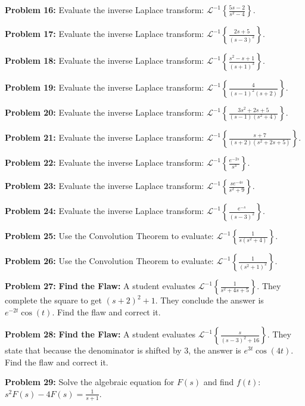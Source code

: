 \documentclass[11pt, letterpaper]{article}
\theoremstyle{definition}
\theoremstyle{remark}
\begin{document}
\textbf{Problem 16:} Evaluate the inverse Laplace transform: $\displaystyle \mathcal{L}^{-1} \left\{ \frac{5s - 2}{s^2 - 4} \right\}$.

\textbf{Problem 17:} Evaluate the inverse Laplace transform: $\displaystyle \mathcal{L}^{-1} \left\{ \frac{2s + 5}{(s-3)^2} \right\}$.

\textbf{Problem 18:} Evaluate the inverse Laplace transform: $\displaystyle \mathcal{L}^{-1} \left\{ \frac{s^2 - s + 1}{(s+1)^3} \right\}$.

\textbf{Problem 19:} Evaluate the inverse Laplace transform: $\displaystyle \mathcal{L}^{-1} \left\{ \frac{4}{(s-1)^2(s+2)} \right\}$.

\textbf{Problem 20:} Evaluate the inverse Laplace transform: $\displaystyle \mathcal{L}^{-1} \left\{ \frac{3s^2 + 2s + 5}{(s-1)(s^2 + 4)} \right\}$.

\textbf{Problem 21:} Evaluate the inverse Laplace transform: $\displaystyle \mathcal{L}^{-1} \left\{ \frac{s + 7}{(s+2)(s^2 + 2s + 5)} \right\}$.

\textbf{Problem 22:} Evaluate the inverse Laplace transform: $\displaystyle \mathcal{L}^{-1} \left\{ \frac{e^{-2s}}{s^3} \right\}$.

\textbf{Problem 23:} Evaluate the inverse Laplace transform: $\displaystyle \mathcal{L}^{-1} \left\{ \frac{s e^{-4s}}{s^2 + 9} \right\}$.

\textbf{Problem 24:} Evaluate the inverse Laplace transform: $\displaystyle \mathcal{L}^{-1} \left\{ \frac{e^{-s}}{(s-3)^2} \right\}$.

\textbf{Problem 25:} Use the Convolution Theorem to evaluate: $\displaystyle \mathcal{L}^{-1} \left\{ \frac{1}{s(s^2+4)} \right\}$.

\textbf{Problem 26:} Use the Convolution Theorem to evaluate: $\displaystyle \mathcal{L}^{-1} \left\{ \frac{1}{(s^2+1)^2} \right\}$.

\textbf{Problem 27:} \textbf{Find the Flaw:} A student evaluates $\displaystyle \mathcal{L}^{-1} \left\{ \frac{1}{s^2 + 4s + 5} \right\}$. They complete the square to get $(s+2)^2 + 1$. They conclude the answer is $e^{-2t}\cos(t)$. Find the flaw and correct it.

\textbf{Problem 28:} \textbf{Find the Flaw:} A student evaluates $\displaystyle \mathcal{L}^{-1} \left\{ \frac{s}{(s-3)^2 + 16} \right\}$. They state that because the denominator is shifted by $3$, the answer is $e^{3t}\cos(4t)$. Find the flaw and correct it.

\textbf{Problem 29:} Solve the algebraic equation for $F(s)$ and find $f(t)$: $\displaystyle s^2 F(s) - 4F(s) = \frac{1}{s+1}$.
\end{document}
